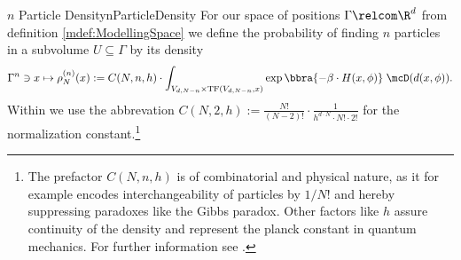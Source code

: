 \begin{mdef}{$n$ Particle Density}{nParticleDensity}
    For our space of positions $\Gamma\relcom\R^d$ from definition \ref{mdef:ModellingSpace} we define the probability of finding $n$ particles in a subvolume $U\subseteq\Gamma$ by its density
    \[
        \Gamma^n\ni x\mapsto \rho_N^{(n)}(x) := C(N,n,h)\cdot \int_{V_{d,N-n}\times\text{TF}(V_{d,N-n},x)}\exp\bbra{-\beta\cdot H(x,\phi)}\;\mcD(d(x,\phi)).
    \]
    Within we use the abbrevation $C(N,2,h):=\frac{N!}{(N-2)!}\cdot\frac{1}{h^{d\cdot N}\cdot N!\cdot 2!}$ for the normalization constant.\footnote{The prefactor $C(N,n,h)$ is of combinatorial and physical nature, as it for example encodes interchangeability of particles by $1/N!$ and hereby suppressing paradoxes like the Gibbs paradox. Other factors like $h$ assure continuity of the density and represent the planck constant in quantum mechanics. For further information see \cite{Hansen_McDonald_1979}.}
\end{mdef}